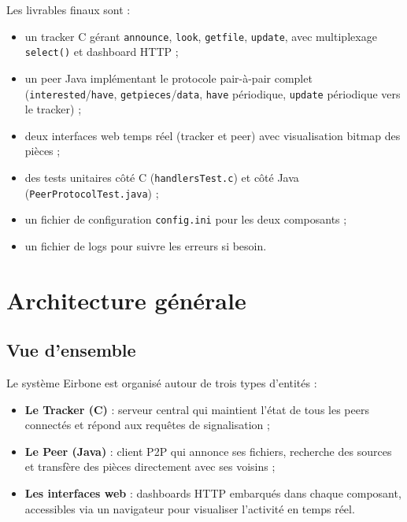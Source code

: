 \documentclass[12pt,a4paper]{article}
\begin{document}
Les livrables finaux sont :
\begin{itemize}[leftmargin=1.2cm]
  \item un tracker C gérant \texttt{announce}, \texttt{look}, \texttt{getfile},
        \texttt{update}, avec multiplexage \texttt{select()} et dashboard HTTP ;
  \item un peer Java implémentant le protocole pair-à-pair complet
        (\texttt{interested}/\texttt{have}, \texttt{getpieces}/\texttt{data},
        \texttt{have} périodique, \texttt{update} périodique vers le tracker) ;
  \item deux interfaces web temps réel (tracker et peer) avec visualisation
        bitmap des pièces ;
  \item des tests unitaires côté C (\texttt{handlersTest.c}) et côté Java
        (\texttt{PeerProtocolTest.java}) ;
  \item un fichier de configuration \texttt{config.ini} pour les deux composants ;
  \item un fichier de logs pour suivre les erreurs si besoin.
\end{itemize}

\section{Architecture générale}

\subsection{Vue d'ensemble}

Le système Eirbone est organisé autour de trois types d'entités :

\begin{itemize}[leftmargin=1.2cm]
  \item \textbf{Le Tracker (C)} : serveur central qui maintient l'état de tous
        les peers connectés et répond aux requêtes de signalisation ;
  \item \textbf{Le Peer (Java)} : client P2P qui annonce ses fichiers, recherche
        des sources et transfère des pièces directement avec ses voisins ;
  \item \textbf{Les interfaces web} : dashboards HTTP embarqués dans chaque
        composant, accessibles via un navigateur pour visualiser l'activité en
        temps réel.
\end{itemize}
\end{document}

